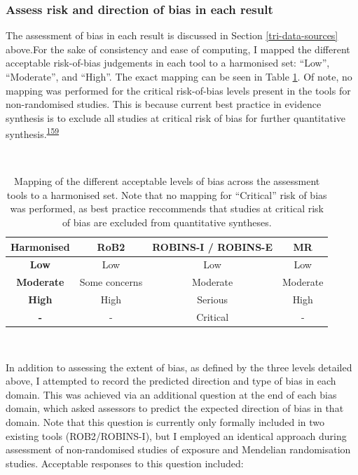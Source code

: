 \documentclass[a4paper, twoside]{templates/ociamthesis}
\begin{document}
\hypertarget{assess-risk-and-direction-of-bias-in-each-result}{%
\subsubsection{Assess risk and direction of bias in each result}\label{assess-risk-and-direction-of-bias-in-each-result}}

The assessment of bias in each result is discussed in Section \ref{tri-data-sources} above.For the sake of consistency and ease of computing, I mapped the different acceptable risk-of-bias judgements in each tool to a harmonised set: ``Low'', ``Moderate'', and ``High''. The exact mapping can be seen in Table \ref{tab:robLevelsMapping-table}. Of note, no mapping was performed for the critical risk-of-bias levels present in the tools for non-randomised studies. This is because current best practice in evidence synthesis is to exclude all studies at critical risk of bias for further quantitative synthesis.\textsuperscript{\protect\hyperlink{ref-sterne2016}{159}}

~\\




\begin{table}[H]

\caption[Mapping of risk-of-bias judgements across assessment tools]{\label{tab:robLevelsMapping-table}Mapping of the different acceptable levels of bias across the assessment tools to a harmonised set. Note that no mapping for ``Critical'' risk of bias was performed, as best practice reccommends that studies at critical risk of bias are excluded from quantitative syntheses.}
\centering
\begin{tabular}[t]{>{}cccc}
\toprule
\textbf{Harmonised} & \textbf{RoB2} & \textbf{ROBINS-I / ROBINS-E} & \textbf{MR}\\
\midrule
\textbf{Low} & Low & Low & Low\\
\midrule
\textbf{Moderate} & Some concerns & Moderate & Moderate\\
\midrule
\textbf{High} & High & Serious & High\\
\midrule
\textbf{-} & - & Critical & -\\
\bottomrule
\end{tabular}
\end{table}

~

In addition to assessing the extent of bias, as defined by the three levels detailed above, I attempted to record the predicted direction and type of bias in each domain. This was achieved via an additional question at the end of each bias domain, which asked assessors to predict the expected direction of bias in that domain. Note that this question is currently only formally included in two existing tools (ROB2/ROBINS-I), but I employed an identical approach during assessment of non-randomised studies of exposure and Mendelian randomisation studies. Acceptable responses to this question included:
\end{document}
